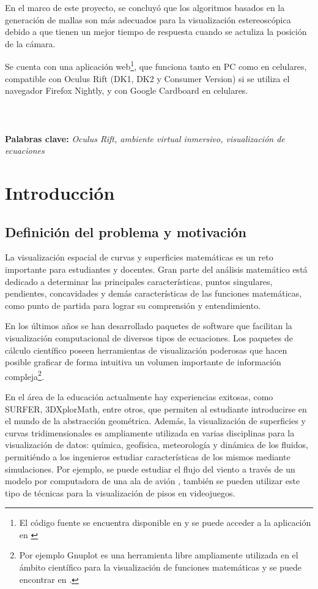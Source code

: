 \documentclass[12pt]{article}
\begin{document}
En el marco de este proyecto, se concluyó que los algoritmos basados en la generación de mallas son más adecuados para la visualización estereoscópica debido a que tienen un mejor tiempo de respuesta cuando se actuliza la posición de la cámara.

Se cuenta con una aplicación web\footnote{El código fuente se encuentra disponible en \cite{nuestrocodigo} y se puede acceder a la aplicación en \cite{nuestrositio}}, que funciona  tanto en PC como en celulares,  compatible con Oculus Rift (DK1, DK2 y Consumer Version) si se utiliza el navegador Firefox Nightly, y con Google Cardboard en celulares.
\\
\\
\\
\\
\textbf{Palabras clave:} \textit{Oculus Rift, ambiente virtual inmersivo, visualización de ecuaciones} 


\clearpage
\null\newpage
\tableofcontents
\clearpage
\null\newpage
\section{Introducción}

\subsection{Definición del problema y motivación}
\noindent La visualización espacial de curvas y superficies matemáticas es un reto importante para estudiantes y docentes. Gran parte del análisis matemático está dedicado a determinar las principales características, puntos singulares, pendientes, concavidades y demás características de las  funciones matemáticas, como punto de partida para lograr su comprensión y entendimiento.

En los últimos años se han desarrollado paquetes de software que facilitan la visualización computacional de diversos tipos de ecuaciones. Los paquetes de cálculo científico poseen herramientas de visualización poderosas que hacen posible graficar de forma intuitiva un volumen importante de información compleja\footnote{Por ejemplo Gnuplot es una herramienta libre ampliamente utilizada en el ámbito científico para la visualización de funciones matemáticas y se puede encontrar en \cite{gnuplot}.}.  

En el área de la educación actualmente hay experiencias exitosas, como SURFER\cite{surfer}, 3DXplorMath\cite{dxplormath}, entre otros, que permiten al estudiante introducirse en el mundo de la abstracción geométrica. Además, la visualización de superficies y curvas tridimensionales es ampliamente utilizada en varias disciplinas para la visualización de datos: química, geofísica, meteorología y dinámica de los fluidos, permitiéndo a los ingenieros estudiar características de los mismos mediante simulaciones. Por ejemplo, se puede estudiar el flujo del viento a través de un modelo por computadora de una ala de avión \cite{aircraftwing}, también se pueden utilizar este tipo de técnicas para la visualización de pisos en videojuegos\cite{realtimerendering}\cite{engine}.
\end{document}
